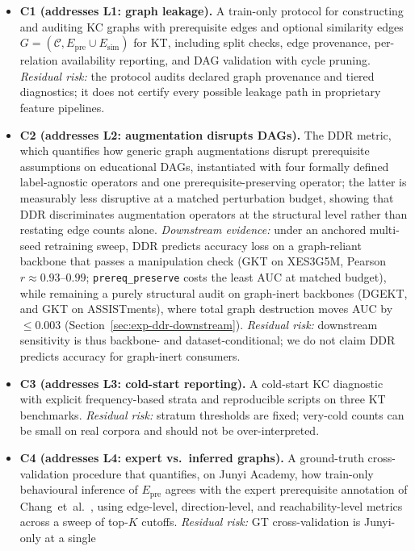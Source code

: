 \documentclass[pdflatex,sn-mathphys-num]{sn-jnl}
\newcommand{\Epre}{\ensuremath{E_{\text{pre}}}}
\newcommand{\Esim}{\ensuremath{E_{\text{sim}}}}
\newcommand{\DDR}{\textsc{DDR}}
\begin{document}
\begin{itemize}
  \item \textbf{C1 (addresses L1: graph leakage).} A train-only protocol
  for constructing and auditing KC graphs with prerequisite edges and
  optional similarity edges $G=(\mathcal{C}, \Epre \cup \Esim)$ for KT,
  including split checks, edge provenance, per-relation availability
  reporting, and DAG validation with cycle pruning.
  \emph{Residual risk:} the protocol audits declared graph provenance and
  tiered diagnostics; it does not certify every possible leakage path in
  proprietary feature pipelines.
  \item \textbf{C2 (addresses L2: augmentation disrupts DAGs).} The
  \DDR{} metric, which quantifies how generic graph augmentations disrupt
  prerequisite assumptions on educational DAGs, instantiated with four
  formally defined label-agnostic operators and one prerequisite-preserving
  operator; the latter is measurably less disruptive at a matched
  perturbation budget, showing that \DDR{} discriminates augmentation
  operators at the structural level rather than restating edge counts alone.
  \emph{Downstream evidence:} under an anchored multi-seed retraining sweep, \DDR{}
  predicts accuracy loss on a graph-reliant backbone that passes a
  manipulation check (GKT on XES3G5M, Pearson $r{\approx}0.93$--$0.99$; \texttt{prereq\_preserve}
  costs the least AUC at matched budget), while remaining a purely structural
  audit on graph-inert backbones (DGEKT, and GKT on ASSISTments), where total
  graph destruction moves AUC by ${\le}0.003$ (Section~\ref{sec:exp-ddr-downstream}).
  \emph{Residual risk:} downstream sensitivity is thus backbone- and
  dataset-conditional; we do not claim \DDR{} predicts accuracy for graph-inert
  consumers.
  \item \textbf{C3 (addresses L3: cold-start reporting).} A cold-start KC
  diagnostic with explicit frequency-based strata and reproducible scripts
  on three KT benchmarks.
  \emph{Residual risk:} stratum thresholds are fixed; very-cold counts can
  be small on real corpora and should not be over-interpreted.
  \item \textbf{C4 (addresses L4: expert vs.\ inferred graphs).} A
  ground-truth cross-validation procedure that quantifies, on Junyi
  Academy, how train-only behavioural inference of $\Epre$ agrees with the
  expert prerequisite annotation of Chang~et~al.~\cite{junyi_dataset},
  using edge-level, direction-level, and reachability-level metrics across
  a sweep of top-$K$ cutoffs.
  \emph{Residual risk:} GT cross-validation is Junyi-only at a single

\end{itemize}
\end{document}
